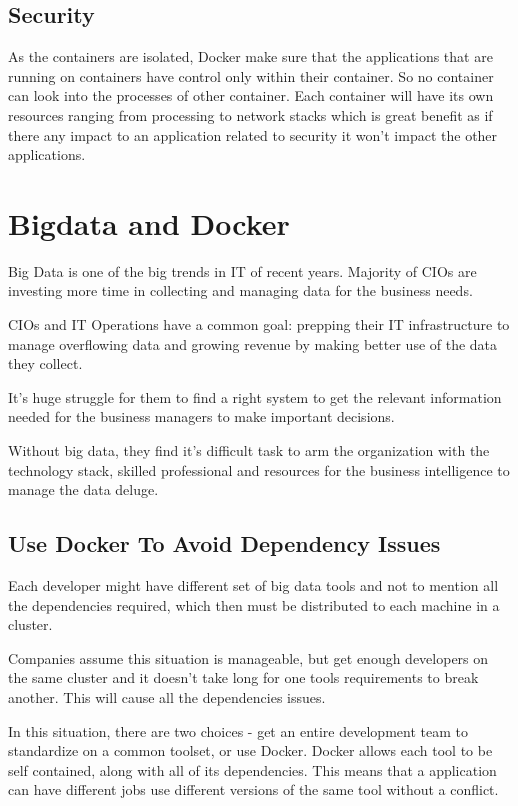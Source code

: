 \documentclass[sigconf]{acmart}
\begin{document}
	\subsection{Security}
	
	As the containers are isolated, Docker make sure that the applications that are running on containers have control only within their container. So no container can look into the processes of other container. Each container will have its own resources ranging from processing to network stacks which is great benefit as if there any impact to an application related to security it won't impact the other applications.
	
	\cite{DockerSecurity}
	
	
	\section{Bigdata and Docker}
	
	Big Data is one of the big trends in IT of recent years. Majority of CIOs are investing more time in collecting and managing data for the business needs.
	
	CIOs and IT Operations have a common goal: prepping their IT infrastructure to manage overflowing data and growing revenue by making better use of the data they collect.
	
	It's huge struggle for them to find a right system to get the relevant information needed for the business managers to make important decisions.
	
	Without big data, they find it's difficult task to arm the organization with the technology stack, skilled professional and resources for the business intelligence to manage the data deluge.
	
	\subsection{Use Docker To Avoid Dependency Issues}
	
	Each developer might have different set of big data tools and not to mention all the dependencies required, which then must be distributed to each machine in a cluster.
	
	Companies assume this situation is manageable, but get enough developers on the same cluster and it doesn't take long for one tools requirements to break another. This will cause all the dependencies issues.
	
	In this situation, there are two choices - get an entire development team to standardize on a common toolset, or use Docker. Docker allows each tool to be self contained, along with all of its dependencies. This means that a application can have different jobs use different versions of the same tool without a conflict.
	
\end{document}
